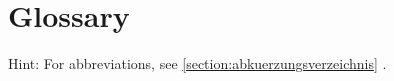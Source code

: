 %
%
\clearpage
\section{Glossary}\label{section.glossar}
Hint: For abbreviations, see \ref{section:abkuerzungsverzeichnis} .


